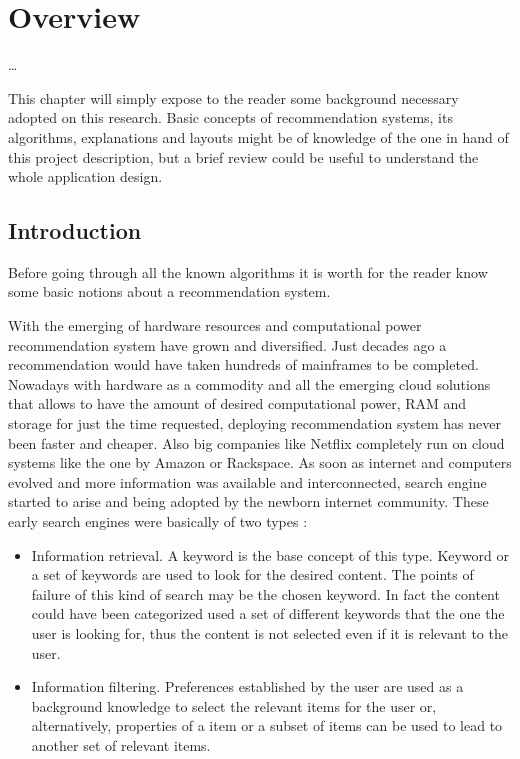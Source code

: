 \chapter{Overview}
\label{chapter:<Overview>}
\ldots

\acresetall

This   chapter   will   simply   expose   to   the   reader   some   background 
necessary adopted on this research. Basic concepts of recommendation systems, its 
algorithms, explanations and layouts might be of knowledge of the one in hand 
of this project description, but a brief review could be useful to understand the 
whole application design.

\section{Introduction}

Before going through all the known algorithms it is worth for the reader know some basic notions about a recommendation system.

With the emerging of hardware resources and computational power recommendation system have grown and diversified. Just decades ago a recommendation would have taken hundreds of mainframes to be completed. Nowadays with hardware as a commodity and all the emerging cloud solutions that allows to have the amount of desired computational power, RAM and storage for just the time requested, deploying recommendation system has never been faster and cheaper. Also big companies like Netflix completely run on cloud systems like the one by Amazon or Rackspace. 
As soon as internet and computers evolved and more information was available and interconnected, search engine started to arise and being adopted by the newborn internet community. These early search engines were basically of two types \cite{spiegazione_confidenza_raccomandazione}:
\begin{itemize}
\item Information retrieval. A keyword is the base concept of this type. Keyword or a set of keywords are used to look for the desired content. The points of failure of this kind of search may be the chosen keyword. In fact the content could have been categorized used a set of different keywords that the one the user is looking for, thus the content is not selected even if it is relevant to the user.
\item Information filtering. Preferences established by the user are used as a background knowledge to select the relevant items for the user or, alternatively, properties of a item or a subset of items can be used to lead to another set of relevant items.
\end{itemize}

